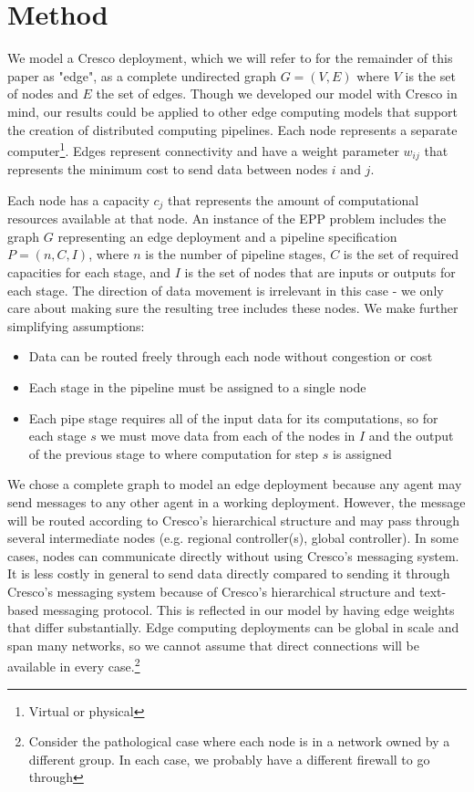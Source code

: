 \documentclass[conference]{IEEEtran}
\begin{document}
    \section{Method}
	We model a Cresco deployment, which we will refer to for the remainder of this paper as "edge", as a complete undirected graph $G=(V,E)$ where $V$ is the set of nodes and $E$ the set of edges. Though we developed our model with Cresco in mind, our results could be applied to other edge computing models that support the creation of distributed computing pipelines.  Each node represents a separate computer\footnote{Virtual or physical}. Edges represent connectivity and have a weight parameter $w_{ij}$ that represents the minimum cost to send data between nodes $i$ and $j$.
	
	Each node has a capacity $c_{j}$ that represents the amount of computational resources available at that node. An instance of the EPP problem includes the graph $G$ representing an edge deployment and a pipeline specification $P = (n, C, I)$, where  $n$ is the number of pipeline stages, $C$ is the set of required capacities for each stage, and $I$ is the set of nodes that are inputs or outputs for each stage. The direction of data movement is irrelevant in this case - we only care about making sure the resulting tree includes these nodes.  We make further simplifying assumptions:
	\begin{itemize}
		\item Data can be routed freely through each node without congestion or cost
		\item Each stage in the pipeline must be assigned to a single node
		\item Each pipe stage requires all of the input data for its computations, so for each stage $s$ we must move data from each of the nodes in $I$ and the output of the previous stage to where computation for step $s$ is assigned
	\end{itemize}
	
	We chose a complete graph to model an edge deployment because any agent may send messages to any other agent in a working deployment. However, the message will be routed according to Cresco's hierarchical structure and may pass through several intermediate nodes (e.g. regional controller(s), global controller). In some cases, nodes can communicate directly without using Cresco's messaging system. It is less costly in general to send data directly compared to sending it through Cresco's messaging system because of Cresco's hierarchical structure and text-based messaging protocol. This is reflected in our model by having edge weights that differ substantially. Edge computing deployments can be global in scale and span many networks, so we  cannot assume that direct connections will be available in every case.\footnote{Consider the pathological case where each node is in a network owned by a different group. In each case, we probably have a different firewall to go through}
	
\end{document}
